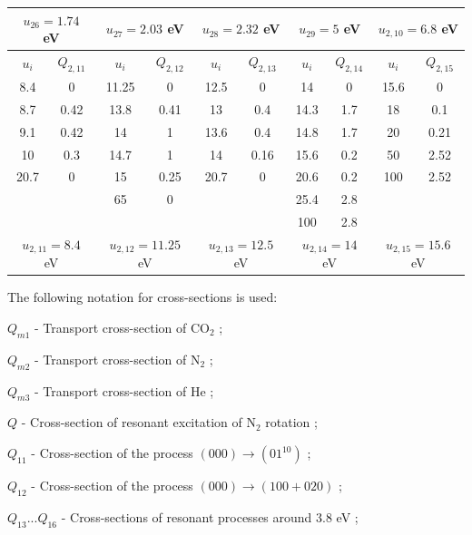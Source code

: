\documentclass{report}
\begin{document}
\begin{tabular}{|c|c||c|c||c|c||c|c||c|c|}
\multicolumn{2}{|c||}{$u_{26}=1.74$ eV} &
\multicolumn{2}{c||}{$u_{27}=2.03$ eV} &
\multicolumn{2}{c||}{$u_{28}=2.32$ eV} &
\multicolumn{2}{c||}{$u_{29}=5$ eV} &
\multicolumn{2}{c|}{$u_{2,10}=6.8$ eV}\\
\hline
\hline 
$u_i$ & $Q_{2,11}$ & $u_i$ & $Q_{2,12}$ & $u_i$ & $Q_{2,13}$ & $u_i$ & $Q_{2,14}$ & $u_i$ & $Q_{2,15}$ \\                                                                             
\hline
8.4  & 0      & 11.25 & 0     & 12.5  & 0     & 14   & 0    & 15.6 & 0     \\
8.7  & 0.42   & 13.8  & 0.41  & 13    & 0.4   & 14.3 & 1.7  & 18   & 0.1   \\
9.1  & 0.42   & 14    & 1     & 13.6  & 0.4   & 14.8 & 1.7  & 20   & 0.21  \\
10   & 0.3    & 14.7  & 1     & 14    & 0.16  & 15.6 & 0.2  & 50   & 2.52  \\
20.7 & 0      & 15    & 0.25  & 20.7  & 0     & 20.6 & 0.2  & 100  & 2.52  \\
     &        & 65    & 0     &       &       & 25.4 & 2.8  &      &       \\
     &        &       &       &       &       & 100  & 2.8  &      &       \\
\multicolumn{2}{|c||}{$u_{2,11}=8.4$ eV} &
\multicolumn{2}{c||}{$u_{2,12}=11.25$ eV} &
\multicolumn{2}{c||}{$u_{2,13}=12.5$ eV} &
\multicolumn{2}{c||}{$u_{2,14}=14$ eV} &
\multicolumn{2}{c|}{$u_{2,15}=15.6$ eV}\\
\hline 
\end{tabular} 

The following notation for cross-sections is used:

$Q_{m1}$ - Transport cross-section of {CO$_2$} \cite{Lowke-1973};

$Q_{m2}$ - Transport cross-section of {N$_2$} \cite{Frost-1962};

$Q_{m3}$ - Transport cross-section of He \cite{Lowke-1973};

$Q$ - Cross-section of resonant excitation of {N$_2$} rotation  \cite{Oksyuk-1966,Chandra-1973};

$Q_{11}$ - Cross-section of the process $(000)\rightarrow(01^10)$  \cite{Lowke-1973};

$Q_{12}$ - Cross-section of the process $(000)\rightarrow(100+020)$  \cite{Lowke-1973};

$Q_{13}...Q_{16}$ - Cross-sections of resonant processes around 3.8 eV  \cite{Lowke-1973};
\end{document}
